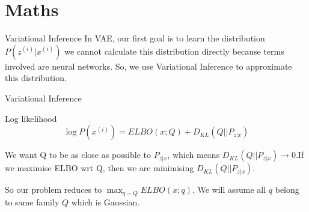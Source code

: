 \section*{Maths}
\begin{frame}{Variational Inference}
In VAE, our first goal is to learn the distribution $P(z^{(i)}|x^{(i)})$ we cannot calculate this distribution directly because terms involved are neural networks. So, we use Variational Inference to approximate this distribution.
\end{frame}

\begin{frame}{Variational Inference}
    \begin{block}{Log likelihood}
        \begin{equation}
            \log P(x^{(i)}) = ELBO(x;Q) + D_{KL}(Q||P_{z|x})
        \end{equation}
    \end{block}
    We want Q to be as close as possible to $P_{z|x}$, which means $D_{KL}(Q||P_{z|x}) \longrightarrow 0$.If we maximise ELBO wrt Q, then we are minimising $D_{KL}(Q||P_{z|x})$.

    So our problem reduces to $\max_{q \sim Q} ELBO(x;q)$. We will assume all $q$ belong to same family $Q$ which is Gaussian.
\end{frame}
